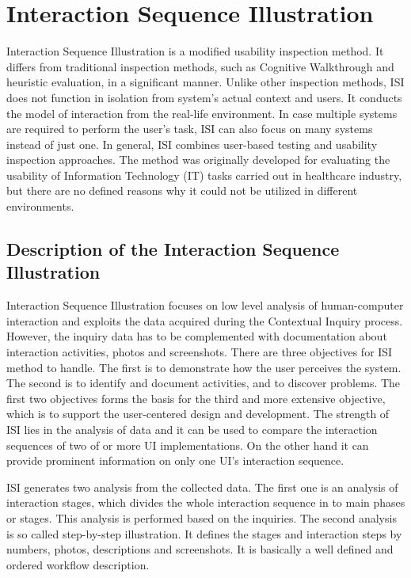 \documentclass[12pt,a4paper,oneside,pdftex]{report}
\begin{document}
\section{Interaction Sequence Illustration}
\label{sec:isi}
Interaction Sequence Illustration is a modified usability inspection method. It differs from traditional inspection methods, such as Cognitive Walkthrough and heuristic evaluation, in a significant manner. Unlike other inspection methods, ISI does not function in isolation from system's actual context and users. It conducts the model of interaction from the real-life environment. In case multiple systems are required to perform the user's task, ISI can also focus on many systems instead of just one. \cite{RefWorks:17} In general, ISI combines user-based testing and usability inspection approaches. The method was originally developed for evaluating the usability of Information Technology (IT) tasks carried out in healthcare industry, but there are no defined reasons why it could not be utilized in different environments.

\subsection{Description of the Interaction Sequence Illustration}
Interaction Sequence Illustration focuses on low level analysis of human-computer interaction and exploits the data acquired during the Contextual Inquiry process. However, the inquiry data has to be complemented with documentation about interaction activities, photos and screenshots. There are three objectives for ISI method to handle. The first is to demonstrate how the user perceives the system. The second is to identify and document activities, and to discover problems. The first two objectives forms the basis for the third and more extensive objective, which is to support the user-centered design and development. \cite{RefWorks:17}  The strength of ISI lies in the analysis of data and it can be used to compare the interaction sequences of two of or more UI implementations. On the other hand it can 		provide prominent information on only one UI's interaction sequence. 

ISI generates two analysis from the collected data. The first one is an analysis of interaction stages, which divides the whole interaction sequence in to main phases or stages. This analysis is performed based on the inquiries. The second analysis is so called step-by-step illustration. It defines the stages and interaction steps by numbers, photos, descriptions and screenshots. \cite{RefWorks:17} It is basically a well defined and ordered workflow description. 
\end{document}
